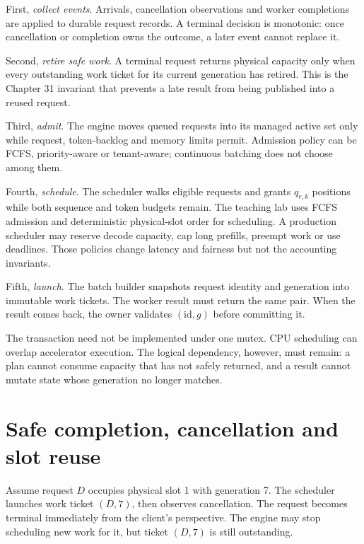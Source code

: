 First, \emph{collect events}. Arrivals, cancellation observations and worker
completions are applied to durable request records. A terminal decision is
monotonic: once cancellation or completion owns the outcome, a later event
cannot replace it.

Second, \emph{retire safe work}. A terminal request returns physical capacity
only when every outstanding work ticket for its current generation has
retired. This is the Chapter 31 invariant that prevents a late result from
being published into a reused request.

Third, \emph{admit}. The engine moves queued requests into its managed active
set only while request, token-backlog and memory limits permit. Admission
policy can be FCFS, priority-aware or tenant-aware; continuous batching does
not choose among them.

Fourth, \emph{schedule}. The scheduler walks eligible requests and grants
$q_{r,k}$ positions while both sequence and token budgets remain. The teaching
lab uses FCFS admission and deterministic physical-slot order for scheduling.
A production scheduler may reserve decode
capacity, cap long prefills, preempt work or use deadlines. Those policies
change latency and fairness but not the accounting invariants.

Fifth, \emph{launch}. The batch builder snapshots request identity and
generation into immutable work tickets. The worker result must return the same
pair. When the result comes back, the owner validates
$(\mathrm{id},g)$ before committing it.


The transaction need not be implemented under one mutex. CPU scheduling can
overlap accelerator execution. The logical dependency, however, must remain:
a plan cannot consume capacity that has not safely returned, and a result
cannot mutate state whose generation no longer matches.

\section{Safe completion, cancellation and slot reuse}

Assume request $D$ occupies physical slot 1 with generation 7. The scheduler
launches work ticket $(D,7)$, then observes cancellation. The request becomes
terminal immediately from the client's perspective. The engine may stop
scheduling new work for it, but ticket $(D,7)$ is still outstanding.

